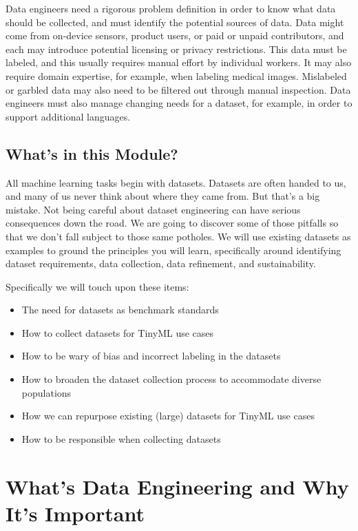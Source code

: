 Data engineers need a rigorous problem definition in order to know what data should be collected, and must identify the potential sources of data. Data might come from on-device sensors, product users, or paid or unpaid contributors, and each may introduce potential licensing or privacy restrictions. This data must be labeled, and this usually requires manual effort by individual workers. It may also require domain expertise, for example, when labeling medical images. Mislabeled or garbled data may also need to be filtered out through manual inspection. Data engineers must also manage changing needs for a dataset, for example, in order to support additional languages.

\subsection{What's in this Module?}

All machine learning tasks begin with datasets. Datasets are often handed to us, and many of us never think about where they came from. But that’s a big mistake. Not being careful about dataset engineering can have serious consequences down the road. We are going to discover some of those pitfalls so that we don’t fall subject to those same potholes. We will use existing datasets as examples to ground the principles you will learn, specifically around identifying dataset requirements, data collection, data refinement, and sustainability. 

Specifically we will touch upon these items: 

\begin{itemize}
  \item The need for datasets as benchmark standards
  \item How to collect datasets for TinyML use cases
  \item How to be wary of bias and incorrect labeling in the datasets
  \item How to broaden the dataset collection process to accommodate diverse populations
  \item How we can repurpose existing (large) datasets for TinyML use cases
  \item How to be responsible when collecting datasets
\end{itemize}

\section{What's Data Engineering and Why It's Important}

